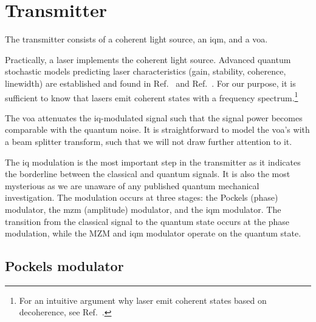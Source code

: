 \section{Transmitter}

The transmitter consists of a coherent light source, an \gls{iqm}, and a \gls{voa}.

Practically, a laser implements the coherent light source.
Advanced quantum stochastic models predicting laser characteristics (gain, stability, coherence, linewidth) are established and found in  Ref.~\cite[p.~900]{Mandel1995} and Ref.~\cite{Haken2012}.
For our purpose, it is sufficient to know that lasers emit coherent states with a frequency spectrum.\footnote{For an intuitive argument why laser emit coherent states based on decoherence, see Ref.~\cite{Gea1998}.}

The \gls{voa} attenuates the \gls{iq}-modulated signal such that the signal power becomes comparable with the quantum noise.
It is straightforward to model the \gls{voa}'s with a beam splitter transform, such that we will not draw further attention to it.

The \gls{iq} modulation is the most important step in the transmitter as it indicates the borderline between the classical and quantum signals.
It is also the most mysterious as we are unaware of any published quantum mechanical investigation.
The modulation occurs at three stages: the Pockels (phase) modulator, the \gls{mzm} (amplitude) modulator, and the \gls{iqm} modulator.
The transition from the classical signal to the quantum state occurs at the phase modulation, while the MZM and \gls{iqm} modulator operate on the quantum state.

\subsection{Pockels modulator}


